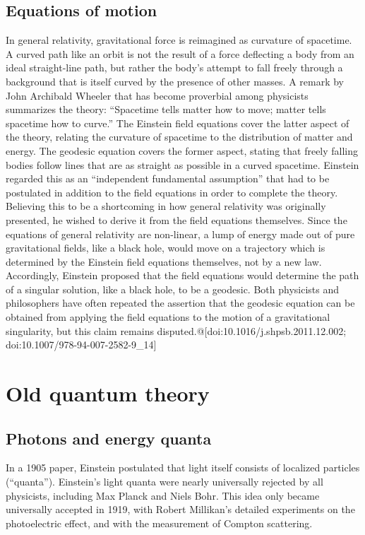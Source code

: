 \documentclass[twoside]{memoir}
\begin{document}
\section{Equations of motion}
In general relativity, gravitational force is reimagined as curvature of spacetime. A curved path like an orbit is not the result of a force deflecting a body from an ideal straight-line path, but rather the body's attempt to fall freely through a background that is itself curved by the presence of other masses. A remark by John Archibald Wheeler that has become proverbial among physicists summarizes the theory: \enquote{Spacetime tells matter how to move; matter tells spacetime how to curve.}\cite{Kersting_2019} The Einstein field equations cover the latter aspect of the theory, relating the curvature of spacetime to the distribution of matter and energy. The geodesic equation covers the former aspect, stating that freely falling bodies follow lines that are as straight as possible in a curved spacetime. Einstein regarded this as an \enquote{independent fundamental assumption} that had to be postulated in addition to the field equations in order to complete the theory. Believing this to be a shortcoming in how general relativity was originally presented, he wished to derive it from the field equations themselves. Since the equations of general relativity are non-linear, a lump of energy made out of pure gravitational fields, like a black hole, would move on a trajectory which is determined by the Einstein field equations themselves, not by a new law. Accordingly, Einstein proposed that the field equations would determine the path of a singular solution, like a black hole, to be a geodesic. Both physicists and philosophers have often repeated the assertion that the geodesic equation can be obtained from applying the field equations to the motion of a gravitational singularity, but this claim remains disputed.@[doi:10.1016/j.shpsb.2011.12.002; doi:10.1007/978-94-007-2582-9\_14]
\chapter{Old quantum theory}
\section{Photons and energy quanta}
In a 1905 paper, Einstein postulated that light itself consists of localized particles (\enquote{quanta}). Einstein's light quanta were nearly universally rejected by all physicists, including Max Planck and Niels Bohr. This idea only became universally accepted in 1919, with Robert Millikan's detailed experiments on the photoelectric effect, and with the measurement of Compton scattering.
\end{document}
